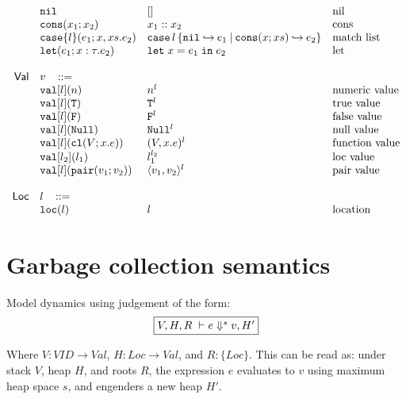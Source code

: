 \documentclass[11pt]{article}
\newcommand{\ms}[1]{\ensuremath{\mathsf{#1}}}
\newcommand{\irl}[1]{\mathtt{#1}}
\begin{document}
\[\begin{array}{r l l l l}
 	& \nilexabt					& []   										& \text{nil}\\
 	& \consexabt{x_1}{x_2}					& x_1::x_2   										& \text{cons}\\
 	& \listcaseexabt{l}{e_1}{x}{xs}{e_2}					& \listcaseexcst{l}{e_1}{x}{xs}{e_2}   	& \text{match list}\\
  & \irl{let}(e_1; x : \tau.e_2)			& \irl{let}\; x = e_1 \; \irl{in}\; e_2   	& \text{let}\\
  \\
\ms{Val}
        & v   \,\,\,\,\, ::= \\
 	& \irl{val}[l](n)                                			& n^l 												& \text{numeric value}\\
 	& \irl{val}[l](\irl{T})                               			& \irl{T}^l 								  & \text{true value}\\
 	& \irl{val}[l](\irl{F})                                			& \irl{F}^l								  & \text{false value}\\
 	& \irl{val}[l](\irl{Null})                                  & \irl{Null}^l 								  & \text{null value}\\
 	& \irl{val}[l](\irl{cl}(V; x.e))                & (V, x.e)^l 					& \text{function value}\\
 	& \irl{val}[l_2](l_1)                                			& l_1^{l_2} 								  & \text{loc value}\\
 	& \irl{val}[l](\pairexabt{v_1}{v_2})                             & \pairexcst{v_1}{v_2}^l 								  & \text{pair value}\\
  \\
\ms{Loc}
        & l   \,\,\,\,\, ::= \\
 	& \irl{loc}(l)                                			& l 												& \text{location}\\
\end{array}
\]

\section{Garbage collection semantics}

Model dynamics using judgement of the form:
\[
\fbox{$V,H,R \; \vdash e \Downarrow^s v, H'$}
\]

Where $V : VID \to Val$, $H : Loc \to Val$, and $R : \{Loc\}$. This can be read as: under stack $V$, heap $H$, and roots $R$,
the expression $e$ evaluates to $v$ using maximum heap space $s$, and engenders a new heap $H'$.\\
\end{document}

